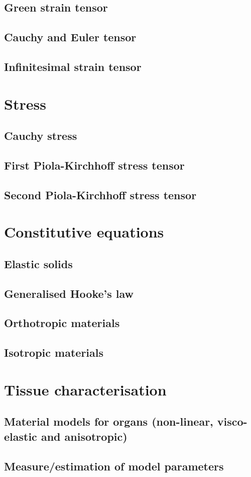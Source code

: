 	\subsection{Green strain tensor}
	\subsection{Cauchy and Euler tensor}
	\subsection{Infinitesimal strain tensor}
	
\section{Stress}
	\subsection{Cauchy stress}
	\subsection{First Piola-Kirchhoff stress tensor}
	\subsection{Second Piola-Kirchhoff stress tensor}
	
\section{Constitutive equations}
	\subsection{Elastic solids}	
	\subsection{Generalised Hooke's law}
	\subsection{Orthotropic materials}
	\subsection{Isotropic materials}
			
\section{Tissue characterisation}
	\subsection{Material models for organs (non-linear, visco-elastic and anisotropic)}
	\subsection{Measure/estimation of model parameters}